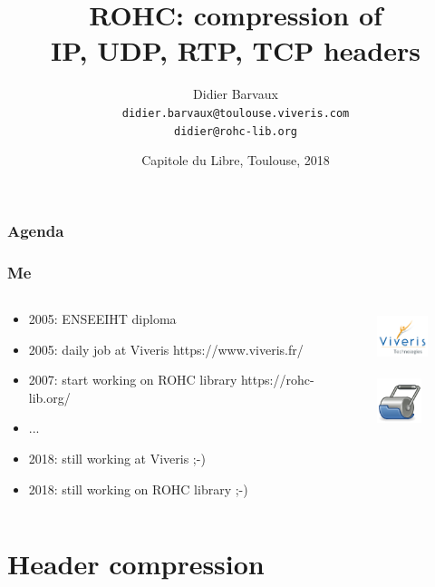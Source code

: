 \documentclass[utf8]{beamer}
\title{ROHC: compression of \\IP, UDP, RTP, TCP headers}
\author[Viveris]{Didier Barvaux \\ \texttt{didier.barvaux@toulouse.viveris.com} \\ \texttt{didier@rohc-lib.org}}
\date[Formation]{Capitole du Libre, Toulouse, 2018}
\begin{document}
\begin{frame}
		\titlepage
\end{frame}

\begin{frame}
	\frametitle{Agenda}
	\tableofcontents[hideallsubsections]
\end{frame}

\begin{frame}
	\frametitle{Me}
	\begin{block}{}
		\begin{columns}
			\begin{column}[T]{75mm}
				\begin{itemize}
					\item 2005: ENSEEIHT diploma
					\item 2005: daily job at Viveris {\tiny https://www.viveris.fr/}
					\item 2007: start working on ROHC library {\tiny https://rohc-lib.org/}
					\item ...
					\item 2018: still working at Viveris ;-)
					\item 2018: still working on ROHC library ;-)
				\end{itemize}
			\end{column}
			\begin{column}[T]{25mm}
				\begin{figure}
					\includegraphics[height=15mm]{images/viveris_logo.png}
				\end{figure}
				\begin{figure}
					\includegraphics[height=13mm]{images/rohc_logo.png}
				\end{figure}
			\end{column}
		\end{columns}
	\end{block}
\end{frame}




\section{Header compression}
\end{document}
